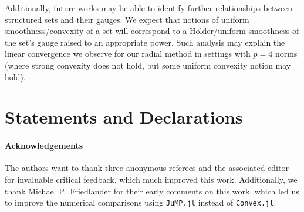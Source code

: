 \documentclass[sn-mathphys,Numbered]{sn-jnl}%
\begin{document}
Additionally, future works may be able to identify further relationships between structured sets and their gauges. We expect that notions of uniform smoothness/convexity of a set will correspond to a H\"older/uniform smoothness of the set's gauge raised to an appropriate power.
Such analysis may explain the linear convergence we observe for our radial method in settings with $p=4$ norms (where strong convexity does not hold, but some uniform convexity notion may hold).






\section*{Statements and Declarations}

\paragraph{Acknowledgements}
The authors want to thank three anonymous referees and the associated editor for invaluable critical feedback, which much improved this work. Additionally, we thank Michael P.~Friedlander for their early comments on this work, which led us to improve the numerical comparisons using \texttt{JuMP.jl} instead of \texttt{Convex.jl}. 
\end{document}
